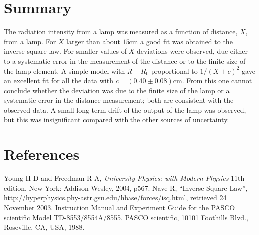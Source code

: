\documentclass[10pt]{iopart}
\begin{document}
\section{Summary}

The radiation intensity from a lamp was measured as a function of
distance, $X$, from a lamp. For  $X$ larger than about $15$cm a
good fit was obtained to the inverse square law. For smaller
values of $X$ deviations were observed, due either to a systematic
error in the measurement of the distance or to the finite size of
the lamp element. A simple model with $R-R_0$  proportional to
$1/(X+c)^2$ gave an excellent fit for all the data with  $c =
(0.40 \pm 0.08)$cm. From this one cannot conclude whether the
deviation was due to the finite size of the lamp or a systematic
error in the distance measurement; both are consistent with the
observed data. A small long term drift of the output of the lamp
was observed, but this was insignificant compared with the other
sources of uncertainty.

\section*{References}

\begin{thebibliography}{10}
 Young H D and Freedman R A, {\it University Physics:
with Modern Physics} 11th edition. New York: Addison Wesley, 2004,
p567.
 Nave R, ``Inverse Square Law'',
http://hyperphysics.phy-astr.gsu.edu/hbase/forces/isq.html,
retrieved 24 November 2003.
 Instruction Manual and Experiment Guide for the PASCO
scientific Model TD-8553/8554A/8555. PASCO scientific, 10101
Foothills Blvd., Roseville, CA, USA, 1988.
\end{thebibliography}
\end{document}
